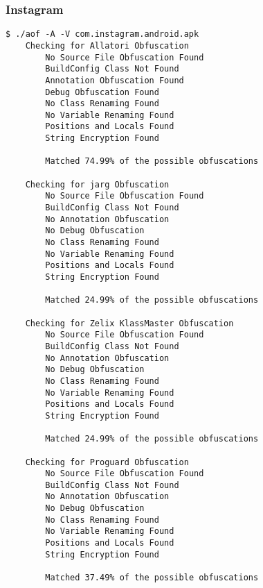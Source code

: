\subsubsection{Instagram \cite{instagram}}
\label{app:agram}
\begin{lstlisting}
$ ./aof -A -V com.instagram.android.apk
    Checking for Allatori Obfuscation
        No Source File Obfuscation Found
        BuildConfig Class Not Found
        Annotation Obfuscation Found
        Debug Obfuscation Found
        No Class Renaming Found
        No Variable Renaming Found
        Positions and Locals Found
        String Encryption Found

        Matched 74.99% of the possible obfuscations

    Checking for jarg Obfuscation
        No Source File Obfuscation Found
        BuildConfig Class Not Found
        No Annotation Obfuscation
        No Debug Obfuscation
        No Class Renaming Found
        No Variable Renaming Found
        Positions and Locals Found
        String Encryption Found

        Matched 24.99% of the possible obfuscations

    Checking for Zelix KlassMaster Obfuscation
        No Source File Obfuscation Found
        BuildConfig Class Not Found
        No Annotation Obfuscation
        No Debug Obfuscation
        No Class Renaming Found
        No Variable Renaming Found
        Positions and Locals Found
        String Encryption Found

        Matched 24.99% of the possible obfuscations

    Checking for Proguard Obfuscation
        No Source File Obfuscation Found
        BuildConfig Class Not Found
        No Annotation Obfuscation
        No Debug Obfuscation
        No Class Renaming Found
        No Variable Renaming Found
        Positions and Locals Found
        String Encryption Found

        Matched 37.49% of the possible obfuscations
\end{lstlisting}
\newpage
